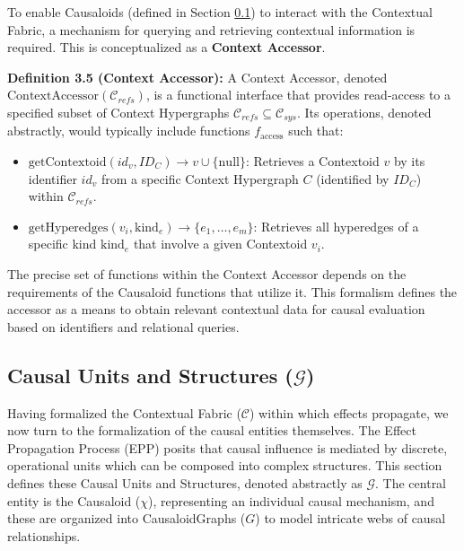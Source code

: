    To enable Causaloids (defined in Section \ref{sec:formalization_causal_units}) to interact with the Contextual Fabric, a mechanism for querying and retrieving contextual information is required. This is conceptualized as a \textbf{Context Accessor}.

    \noindent\textbf{Definition 3.5 (Context Accessor):} A Context Accessor, denoted \(\text{ContextAccessor}(\mathcal{C}_{refs})\), is a functional interface that provides read-access to a specified subset of Context Hypergraphs \(\mathcal{C}_{refs} \subseteq \mathcal{C}_{sys}\).
    Its operations, denoted abstractly, would typically include functions \(f_{\text{access}}\) such that: %
    \begin{itemize} 
        \item \(\text{getContextoid}(id_v, ID_C) \to v \cup \{\text{null}\}\): Retrieves a Contextoid \(v\) by its identifier \(id_v\) from a specific Context Hypergraph \(C\) (identified by \(ID_C\)) within \(\mathcal{C}_{refs}\).
        \item \(\text{getHyperedges}(v_i, \text{kind}_e) \to \{e_1, \dots, e_m\}\): Retrieves all hyperedges of a specific kind \(\text{kind}_e\) that involve a given Contextoid \(v_i\).
    \end{itemize}
    The precise set of functions within the Context Accessor depends on the requirements of the Causaloid functions that utilize it. This formalism defines the accessor as a means to obtain relevant contextual data for causal evaluation based on identifiers and relational queries.



\subsection[Causal Units and Structures (G)]{Causal Units and Structures (\(\mathcal{G}\))} %
\label{sec:formalization_causal_units}

Having formalized the Contextual Fabric (\(\mathcal{C}\)) within which effects propagate, we now turn to the formalization of the causal entities themselves. The Effect Propagation Process (EPP) posits that causal influence is mediated by discrete, operational units which can be composed into complex structures. This section defines these Causal Units and Structures, denoted abstractly as \(\mathcal{G}\). The central entity is the Causaloid (\(\chi\)), representing an individual causal mechanism, and these are organized into CausaloidGraphs (\(G\)) to model intricate webs of causal relationships.

